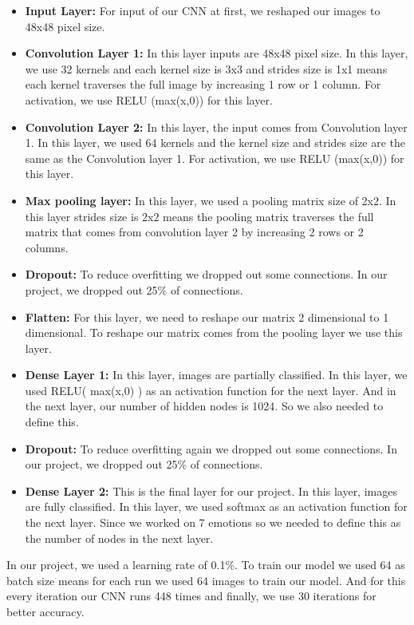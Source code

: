 \documentclass[conference]{IEEEtran}
\begin{document}
\begin{itemize}
\item \textbf{Input Layer: } For input of our CNN at first, we reshaped our images to 48x48 pixel size.
\item \textbf{Convolution Layer 1:}  In this layer inputs are 48x48 pixel size. In this layer, we use 32 kernels and each kernel size is 3x3  and strides size is 1x1 means each kernel traverses the full image by increasing 1 row or 1 column. For activation, we use RELU (max(x,0)) for this layer.
\item \textbf{Convolution Layer 2:} In this layer, the input comes from Convolution layer 1. In this layer, we used 64 kernels and the kernel size and strides size are the same as the Convolution layer 1. For activation, we use RELU (max(x,0)) for this layer.
\item \textbf{Max pooling layer:} In this layer, we used a pooling matrix size of 2x2. In this layer strides size is 2x2 means the pooling matrix traverses the full matrix that comes from convolution layer 2  by increasing 2 rows or 2 columns. 
\item \textbf{Dropout: } To reduce overfitting we dropped out some connections. In our project, we dropped out 25\% of connections. 
\item \textbf{Flatten:} For this layer, we need to reshape our matrix 2 dimensional to 1 dimensional. To reshape our matrix comes from the pooling layer we use this layer.
\item \textbf{Dense Layer 1: } In this layer, images are partially classified. In this layer, we used RELU( max(x,0) ) as an activation function for the next layer. And in the next layer, our number of hidden nodes is 1024. So we also needed to define this.
\item \textbf{Dropout: }To reduce overfitting again we dropped out some connections. In our project, we dropped out 25\% of connections.
\item \textbf{Dense Layer 2: } This is the final layer for our project.  In this layer, images are fully classified. In this layer, we used softmax as an activation function for the next layer. Since we worked on 7 emotions so we needed to define this as the number of nodes in the next layer. 

\end{itemize}

In our project, we used a learning rate of 0.1\%.  To train our model we used 64 as batch size means for each run we used 64 images to train our model. And for this every iteration our CNN runs 448 times and finally, we use 30 iterations for better accuracy. 
\end{document}
